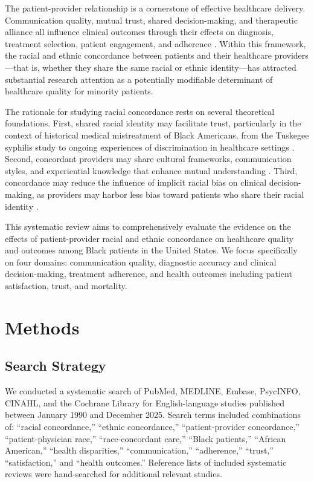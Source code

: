 \documentclass[12pt]{article}
\begin{document}
The patient-provider relationship is a cornerstone of effective healthcare delivery. Communication quality, mutual trust, shared decision-making, and therapeutic alliance all influence clinical outcomes through their effects on diagnosis, treatment selection, patient engagement, and adherence \citep{street2008}. Within this framework, the racial and ethnic concordance between patients and their healthcare providers---that is, whether they share the same racial or ethnic identity---has attracted substantial research attention as a potentially modifiable determinant of healthcare quality for minority patients.

The rationale for studying racial concordance rests on several theoretical foundations. First, shared racial identity may facilitate trust, particularly in the context of historical medical mistreatment of Black Americans, from the Tuskegee syphilis study to ongoing experiences of discrimination in healthcare settings \citep{gamble1997}. Second, concordant providers may share cultural frameworks, communication styles, and experiential knowledge that enhance mutual understanding \citep{street2008}. Third, concordance may reduce the influence of implicit racial bias on clinical decision-making, as providers may harbor less bias toward patients who share their racial identity \citep{hall2015}.

This systematic review aims to comprehensively evaluate the evidence on the effects of patient-provider racial and ethnic concordance on healthcare quality and outcomes among Black patients in the United States. We focus specifically on four domains: communication quality, diagnostic accuracy and clinical decision-making, treatment adherence, and health outcomes including patient satisfaction, trust, and mortality.

\section{Methods}

\subsection{Search Strategy}

We conducted a systematic search of PubMed, MEDLINE, Embase, PsycINFO, CINAHL, and the Cochrane Library for English-language studies published between January 1990 and December 2025. Search terms included combinations of: ``racial concordance,'' ``ethnic concordance,'' ``patient-provider concordance,'' ``patient-physician race,'' ``race-concordant care,'' ``Black patients,'' ``African American,'' ``health disparities,'' ``communication,'' ``adherence,'' ``trust,'' ``satisfaction,'' and ``health outcomes.'' Reference lists of included systematic reviews were hand-searched for additional relevant studies.
\end{document}
